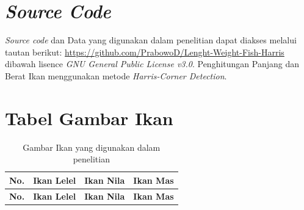 \appendix 

\chapter{\textit{Source Code}}
\textit{Source code} dan Data yang digunakan dalam penelitian dapat diakses melalui tautan berikut: \url{https://github.com/PrabowoD/Lenght-Weight-Fish-Harris}
dibawah lisence \textit{GNU General Public License v3.0}. Penghitungan Panjang dan Berat Ikan menggunakan metode \textit{Harris-Corner Detection}.

\chapter{Tabel Gambar Ikan}

\begin{longtable}{|c|c|c|c|}
        \caption{Gambar Ikan yang digunakan dalam penelitian}\label{tab:allFish} \\
    \hline
    \textbf{No.} & \textbf{Ikan Lelel} & \textbf{Ikan Nila} & \textbf{Ikan Mas} \\
    \hline
    \endfirsthead
    \hline
    \textbf{No.} & \textbf{Ikan Lelel} & \textbf{Ikan Nila} & \textbf{Ikan Mas} \\
    \hline
    \endhead


\end{longtable}
